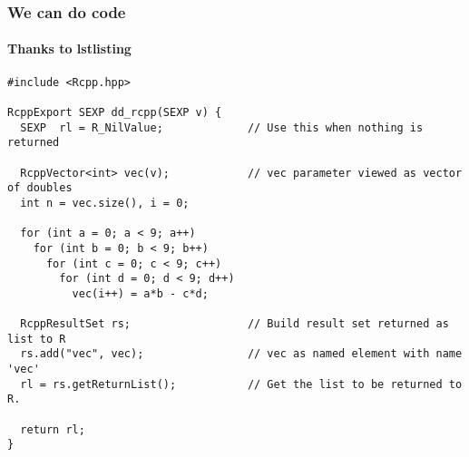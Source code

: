 \documentclass[smaller,compress]{beamer}
\begin{document}
\begin{frame}[fragile]  %
  \frametitle{We can do code}
  \framesubtitle{Thanks to lstlisting}

\lstset{language=C++,basicstyle=\tiny}
\begin{lstlisting}
#include <Rcpp.hpp>

RcppExport SEXP dd_rcpp(SEXP v) {
  SEXP  rl = R_NilValue;             // Use this when nothing is returned

  RcppVector<int> vec(v);            // vec parameter viewed as vector of doubles
  int n = vec.size(), i = 0;

  for (int a = 0; a < 9; a++)
    for (int b = 0; b < 9; b++)
      for (int c = 0; c < 9; c++)
        for (int d = 0; d < 9; d++)
          vec(i++) = a*b - c*d;

  RcppResultSet rs;                  // Build result set returned as list to R
  rs.add("vec", vec);                // vec as named element with name 'vec'
  rl = rs.getReturnList();           // Get the list to be returned to R.

  return rl;
}
\end{lstlisting}


\end{frame}
\end{document}
